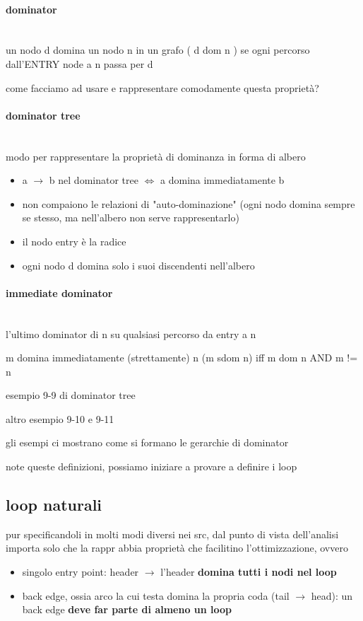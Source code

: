 \paragraph{dominator}~\\

un nodo d domina un nodo n in un grafo ( d dom n ) se ogni percorso dall'ENTRY node a n passa per d

come facciamo ad usare e rappresentare comodamente questa propriet\`a?

\paragraph{dominator tree}~\\

modo per rappresentare la propriet\`a di dominanza in forma di albero

\begin{itemize}
  \item a $\rightarrow$ b nel dominator tree $\iff$ a domina immediatamente b
  \item non compaiono le relazioni di "auto-dominazione" (ogni nodo domina sempre se stesso, ma nell'albero non serve rappresentarlo)
  \item il nodo entry \`e la radice
  \item ogni nodo d domina solo i suoi discendenti nell'albero
\end{itemize}

\paragraph{immediate dominator}~\\

l'ultimo dominator di n su qualsiasi percorso da entry a n

m domina immediatamente (strettamente) n (m sdom n) iff m dom n AND m != n

esempio 9-9 di dominator tree

altro esempio 9-10 e 9-11

gli esempi ci mostrano come si formano le gerarchie di dominator

note queste definizioni, possiamo iniziare a provare a definire i loop

\subsection{loop naturali}

pur specificandoli in molti modi diversi nei src, dal punto di vista dell'analisi importa solo che la rappr abbia propriet\`a che facilitino l'ottimizzazione, ovvero
\begin{itemize}
  \item singolo entry point: header $\rightarrow$ l'header \textbf{domina tutti i nodi nel loop}
  \item back edge, ossia arco la cui testa domina la propria coda (tail $\rightarrow$ head): un back edge \textbf{deve far parte di almeno un loop}
\end{itemize}

